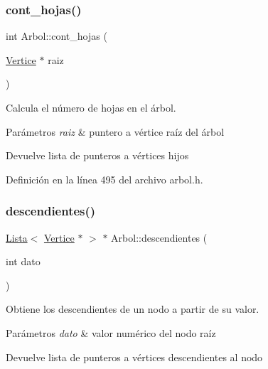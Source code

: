 \subsubsection{\texorpdfstring{cont\+\_\+hojas()}{cont\_hojas()}}
{\footnotesize\ttfamily int Arbol\+::cont\+\_\+hojas (\begin{DoxyParamCaption}\item[{\hyperlink{classVertice}{Vertice} $\ast$}]{raiz }\end{DoxyParamCaption})}



Calcula el número de hojas en el árbol. 


\begin{DoxyParams}{Parámetros}
{\em raiz} & puntero a vértice raíz del árbol \\
\hline
\end{DoxyParams}
\begin{DoxyReturn}{Devuelve}
lista de punteros a vértices hijos 
\end{DoxyReturn}


Definición en la línea 495 del archivo arbol.\+h.

\mbox{\label{classArbol_acae8e9dfd17ae18e250d9029172e1c9e}} 
\subsubsection{\texorpdfstring{descendientes()}{descendientes()}\hspace{0.1cm}{\footnotesize\ttfamily [1/2]}}
{\footnotesize\ttfamily \hyperlink{classLista}{Lista}$<$ \hyperlink{classVertice}{Vertice} $\ast$ $>$ $\ast$ Arbol\+::descendientes (\begin{DoxyParamCaption}\item[{int}]{dato }\end{DoxyParamCaption})}



Obtiene los descendientes de un nodo a partir de su valor. 


\begin{DoxyParams}{Parámetros}
{\em dato} & valor numérico del nodo raíz \\
\hline
\end{DoxyParams}
\begin{DoxyReturn}{Devuelve}
lista de punteros a vértices descendientes al nodo 
\end{DoxyReturn}


